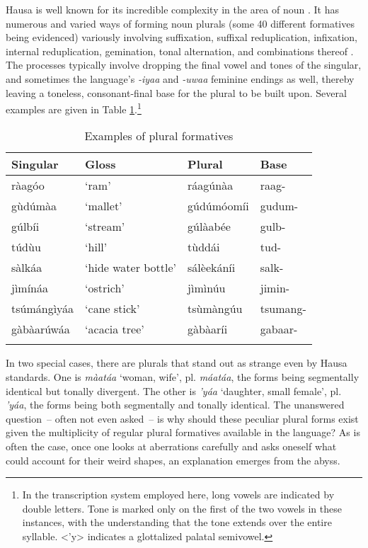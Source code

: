 \documentclass[output=paper,colorlinks,citecolor=brown]{langscibook}
\begin{document}
Hausa is well known for its incredible complexity in the area of noun . It has numerous and varied ways of forming noun plurals (some 40 different formatives being evidenced) variously involving suffixation, suffixal reduplication, infixation, internal reduplication, gemination, tonal alternation, and combinations thereof \citep{Newman2000}. The processes typically involve dropping the final vowel and tones of the singular, and sometimes the language's  \textit{-iyaa} and \textit{-uwaa} feminine endings as well, thereby leaving a toneless, consonant-final base for the plural to be built upon. Several examples are given in Table \ref{tab:PluralFormatives}.\footnote{In the transcription system employed here, long vowels are indicated by double letters. Tone is marked only on the first of the two vowels in these instances, with the understanding that the tone extends over the entire syllable. <'y> indicates a glottalized palatal semivowel.}

\begin{table}
\caption{Examples of plural formatives}
\label{tab:PluralFormatives}
 \begin{tabular}{llll}
  \lsptoprule
  Singular & Gloss & Plural & Base  \\
  \midrule
 ràagóo & `ram'  & ráagúnàa  & raag-\\
 gùdúmàa & `mallet' & gúdúmóomíi & gudum- \\
 gúlbíi &`stream' & gúlàabée & gulb- \\
 túdùu&`hill' & tùddái  & tud- \\
 sàlkáa &`hide water bottle' & sálèekáníi  & salk- \\
 jìmínáa &`ostrich' & jìmìnúu  & jimin- \\
 tsúmángìyáa &`cane stick' & tsùmàngúu & tsumang- \\
 gàbàarúwáa& `acacia tree' & gàbàaríi & gabaar- \\
  \lspbottomrule
 \end{tabular}
\end{table}
 
 In two special cases, there are plurals that stand out as strange even by Hausa standards. One is \textit{màatáa} `woman, wife’, pl. \textit{máatáa}, the forms being segmentally identical but tonally divergent. The other is \textit{’yáa} `daughter, small female’, pl. \textit{’yáa}, the forms being both segmentally and tonally identical. The unanswered question~-- often not even asked~-- is why should these peculiar plural forms exist given the multiplicity of regular plural formatives available in the language? As is often the case, once one looks at aberrations carefully and asks oneself what could account for their weird shapes, an explanation emerges from the abyss.
 
\end{document}
